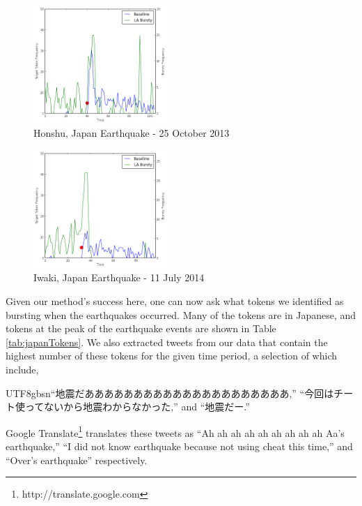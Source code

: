 \documentclass{sig-alternate}
\newcommand{\myfont}{gbsn}
\begin{document}
\begin{figure}[hbt]
\begin{center}
\includegraphics[width=2in]{./figures/2013-japan-quake.png}
\caption{Honshu, Japan Earthquake - 25 October 2013}
\label{fig:2013Japan}
\end{center}
\end{figure}

\begin{figure}[hbtp]
\begin{center}
\includegraphics[width=2in]{./figures/2014-japan-quake.png}
\caption{Iwaki, Japan Earthquake - 11 July 2014}
\label{fig:2014Japan}
\end{center}
\end{figure}

Given our method's success here, one can now ask what tokens we identified as bursting when the earthquakes occurred.
Many of the tokens are in Japanese, and tokens at the peak of the earthquake events are shown in Table \ref{tab:japanTokens}.
We also extracted tweets from our data that contain the highest number of these tokens for the given time period, a selection of which include, \begin{CJK}{UTF8}{\myfont}``地震だあああああああああああああああああああああ,'' ``今回はチート使ってないから地震わからなかった,'' and ``地震だー.'' \end{CJK}
Google Translate\footnote{http://translate.google.com} translates these tweets as ``Ah ah ah ah ah ah ah ah ah Aa's earthquake,'' ``I did not know earthquake because not using cheat this time,'' and ``Over's earthquake'' respectively.
\end{document}
